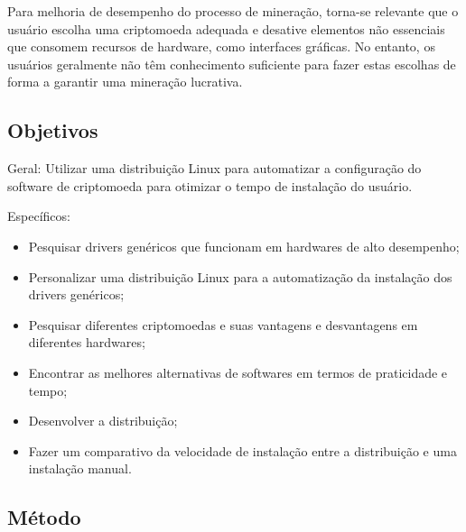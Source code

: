 \documentclass[
article,			%
12pt,				%
openright,			%
oneside,			%
a4paper,			%
chapter=TITLE,		%
section=TITLE,		%
subsection=TITLE,	%
subsubsection=TITLE,%
subsubsubsection=TITLE, %
english,			%
brazil,				%
]{abntex2}
\begin{document}
Para melhoria de desempenho do processo de mineração, torna-se
relevante que o usuário escolha uma criptomoeda adequada e desative
elementos não essenciais que consomem recursos de hardware, como
interfaces gráficas. No entanto, os usuários geralmente não têm
conhecimento suficiente para fazer estas escolhas de forma a garantir
uma mineração lucrativa. 


\subsection{Objetivos}

Geral: Utilizar uma distribuição Linux para automatizar a configuração
do software de criptomoeda para otimizar o tempo de instalação do
usuário.

Específicos: 
\begin{itemize} 

    \item Pesquisar drivers genéricos que funcionam em
        hardwares de alto desempenho;

    \item Personalizar uma distribuição Linux para a automatização da
        instalação dos drivers genéricos;

    \item Pesquisar diferentes criptomoedas e suas vantagens e
        desvantagens em diferentes hardwares;

    \item Encontrar as melhores alternativas de softwares em termos de
        praticidade e tempo;

    \item Desenvolver a distribuição;

    \item Fazer um comparativo da velocidade de instalação entre a
distribuição e uma instalação manual.

\end{itemize}

\subsection{Método}
\end{document}
